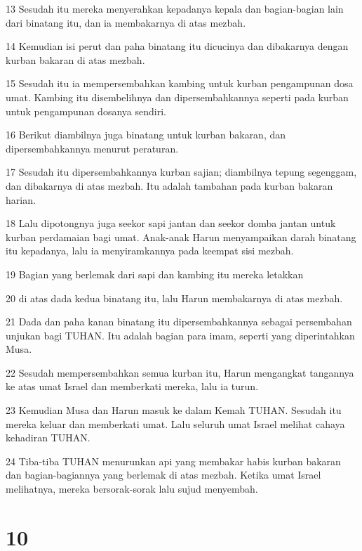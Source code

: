 \par 13 Sesudah itu mereka menyerahkan kepadanya kepala dan bagian-bagian lain dari binatang itu, dan ia membakarnya di atas mezbah.
\par 14 Kemudian isi perut dan paha binatang itu dicucinya dan dibakarnya dengan kurban bakaran di atas mezbah.
\par 15 Sesudah itu ia mempersembahkan kambing untuk kurban pengampunan dosa umat. Kambing itu disembelihnya dan dipersembahkannya seperti pada kurban untuk pengampunan dosanya sendiri.
\par 16 Berikut diambilnya juga binatang untuk kurban bakaran, dan dipersembahkannya menurut peraturan.
\par 17 Sesudah itu dipersembahkannya kurban sajian; diambilnya tepung segenggam, dan dibakarnya di atas mezbah. Itu adalah tambahan pada kurban bakaran harian.
\par 18 Lalu dipotongnya juga seekor sapi jantan dan seekor domba jantan untuk kurban perdamaian bagi umat. Anak-anak Harun menyampaikan darah binatang itu kepadanya, lalu ia menyiramkannya pada keempat sisi mezbah.
\par 19 Bagian yang berlemak dari sapi dan kambing itu mereka letakkan
\par 20 di atas dada kedua binatang itu, lalu Harun membakarnya di atas mezbah.
\par 21 Dada dan paha kanan binatang itu dipersembahkannya sebagai persembahan unjukan bagi TUHAN. Itu adalah bagian para imam, seperti yang diperintahkan Musa.
\par 22 Sesudah mempersembahkan semua kurban itu, Harun mengangkat tangannya ke atas umat Israel dan memberkati mereka, lalu ia turun.
\par 23 Kemudian Musa dan Harun masuk ke dalam Kemah TUHAN. Sesudah itu mereka keluar dan memberkati umat. Lalu seluruh umat Israel melihat cahaya kehadiran TUHAN.
\par 24 Tiba-tiba TUHAN menurunkan api yang membakar habis kurban bakaran dan bagian-bagiannya yang berlemak di atas mezbah. Ketika umat Israel melihatnya, mereka bersorak-sorak lalu sujud menyembah.

\chapter{10}

